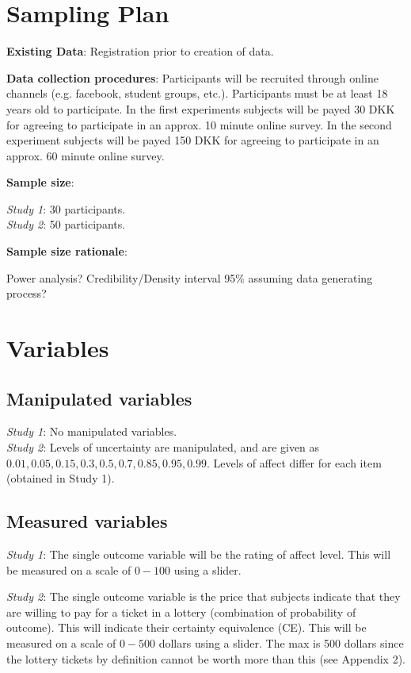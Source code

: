 \documentclass[12pt]{article}
\begin{document}
\section{Sampling Plan}

\textbf{Existing Data}: Registration prior
to creation of data.

\textbf{Data collection procedures}:
Participants will be recruited through online
channels (e.g. facebook, student groups, etc.).
Participants must be at least 18 years old to
participate. In the first experiments subjects
will be payed 30 DKK for agreeing to participate
in an approx. 10 minute online survey. In the
second experiment subjects will be payed 150 DKK
for agreeing to participate in an approx. 60 minute
online survey.

\textbf{Sample size}:

\emph{Study 1}: 30 participants. \\
\emph{Study 2}: 50 participants.

\textbf{Sample size rationale}:

Power analysis?
Credibility/Density interval 95\%
assuming data generating process?

\section{Variables}

\subsection{Manipulated variables}
\emph{Study 1}: No manipulated variables. \\

\emph{Study 2}: Levels of uncertainty are
manipulated, and are given as
$0.01, 0.05, 0.15, 0.3, 0.5, 0.7, 0.85, 0.95, 0.99$.
Levels of affect differ for each item
(obtained in Study 1).

\subsection{Measured variables}
\emph{Study 1}: The single outcome variable
will be the rating of affect level. This will
be measured on a scale of $0-100$ using a
slider.

\emph{Study 2}: The single outcome variable
is the price that subjects indicate that they
are willing to pay for a ticket in a lottery
(combination of probability of outcome).
This will indicate their certainty equivalence (CE).
This will be measured on a scale of $0-500$ dollars
using a slider. The max is 500 dollars since the
lottery tickets by definition cannot be worth
more than this (see Appendix 2).
\end{document}
